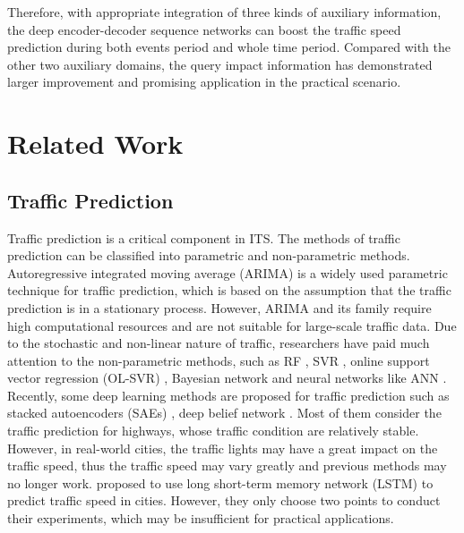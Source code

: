 Therefore, with appropriate integration of three kinds of auxiliary information, the deep encoder-decoder sequence networks can boost the traffic speed prediction during both events period and whole time period. Compared with the other two auxiliary domains, the query impact information has demonstrated larger improvement and promising application in the practical scenario.


\section{Related Work}
\label{relatedwork}

\subsection{Traffic Prediction}
\label{trafficpred}
Traffic prediction is a critical component in ITS. The methods of traffic prediction can be classified into parametric and non-parametric methods. Autoregressive integrated moving average (ARIMA) \cite{ahmed1979analysis} is a widely used parametric technique for traffic prediction, which is based on the assumption that the traffic prediction is in a stationary process. However, ARIMA and its family require high computational resources and are not suitable for large-scale traffic data. Due to the stochastic and non-linear nature of traffic, researchers have paid much attention to the non-parametric methods, such as RF \cite{leshem2007traffic}, SVR \cite{jin2007simultaneously}, online support vector regression (OL-SVR) \cite{castro2009online}, Bayesian network \cite{sun2006bayesian} and neural networks like ANN \cite{vlahogianni2005optimized}. Recently, some deep learning methods are proposed for traffic prediction such as stacked autoencoders (SAEs) \cite{lv2015traffic}, deep belief network \cite{huang2014deep}. Most of them consider the traffic prediction for highways, whose traffic condition are relatively stable. However, in real-world cities, the traffic lights may have a great impact on the traffic speed, thus the traffic speed may vary greatly and previous methods may no longer work. \cite{ma2015long} proposed to use long short-term memory network (LSTM) to predict traffic speed in cities. However, they only choose two points to conduct their experiments, which may be insufficient for practical applications.


